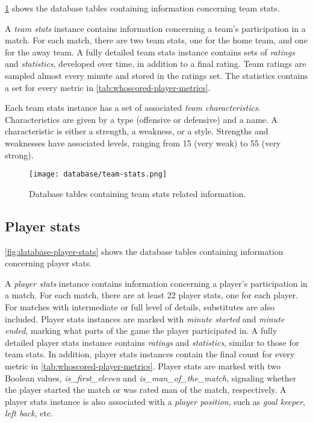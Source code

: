 \cref{fig:database-team-stats} shows the database tables containing information concerning team stats.

A \textit{team stats} instance contains information concerning a team's participation in a match. For each match, there are two team stats, one for the home team, and one for the away team. A fully detailed team stats instance contains sets of \textit{ratings} and \textit{statistics}, developed over time, in addition to a final rating. Team ratings are sampled almost every minute and stored in the ratings set. The statistics contains a set for every metric in \cref{tab:whoscored-player-metrics}.

Each team stats instance has a set of associated \textit{team characteristics}. Characteristics are given by a type (offensive or defensive) and a name. A characteristic is either a strength, a weakness, or a style. Strengths and weaknesses have associated levels, ranging from 15 (very weak) to 55 (very strong).

\begin{figure}
    \centering
    \texttt{[image: database/team-stats.png]}
    \caption{Database tables containing team stats related information.}
    \label{fig:database-team-stats}
\end{figure}


\subsection{Player stats}

\cref{fig:database-player-stats} shows the database tables containing information concerning player stats.

A \textit{player stats} instance contains information concerning a player's participation in a match. For each match, there are at least 22 player stats, one for each player. For matches with intermediate or full level of details, substitutes are also included. Player stats instances are marked with \textit{minute started} and \textit{minute ended}, marking what parts of the game the player participated in. A fully detailed player stats instance contains \textit{ratings} and \textit{statistics}, similar to those for team stats. In addition, player stats instances contain the final count for every metric in \cref{tab:whoscored-player-metrics}. Player stats are marked with two Boolean values, \textit{is\_first\_eleven} and \textit{is\_man\_of\_the\_match}, signaling whether the player started the match or was rated man of the match, respectively. A player stats instance is also associated with a \textit{player position}, such as \textit{goal keeper}, \textit{left back}, etc.

